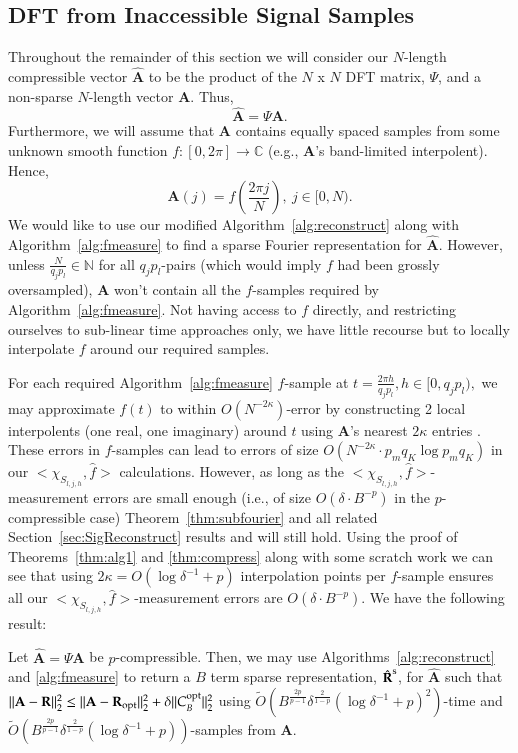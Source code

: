 \documentclass{article}
\begin{document}
\subsection{DFT from Inaccessible Signal Samples}
\label{sec:inaccessible}

Throughout the remainder of this section we will consider our $N$-length compressible vector $\hat{\textbf{A}}$ to be the product of the $N$ x $N$ DFT matrix, \textbf{$\Psi$}, and a non-sparse $N$-length vector \textbf{A}.  Thus,
$$\hat{\textbf{A}} = \Psi \textbf{A}.$$
Furthermore, we will assume that \textbf{A} contains equally spaced samples from some unknown smooth function $f: [0,2 \pi] \rightarrow \mathbb{C}$ (e.g., \textbf{A}'s band-limited interpolent).  Hence,
$$\textbf{A}(j) = f \left( \frac{2 \pi j}{N} \right),~j \in [0,N).$$
We would like to use our modified Algorithm~\ref{alg:reconstruct} along with Algorithm~\ref{alg:fmeasure} to find a sparse Fourier representation for $\hat{\textbf{A}}$.  However, unless $\frac{N}{q_{j}p_{l}} \in \mathbb{N}$ for all $q_{j}p_{l}$-pairs (which would imply $f$ had been grossly oversampled), \textbf{A} won't contain all the $f$-samples required by Algorithm~\ref{alg:fmeasure}.  Not having access to $f$ directly, and restricting ourselves to sub-linear time approaches only, we have little recourse but to locally interpolate $f$ around our required samples.

For each required Algorithm~\ref{alg:fmeasure} $f$-sample at $t = \frac{2 \pi h}{q_{j}p_{l}}, h \in [0,q_{j}p_{l}),$ we may approximate $f(t)$ to within $O(N^{-2 \kappa})$-error by constructing 2 local interpolents (one real, one imaginary) around $t$ using \textbf{A}'s nearest $2 \kappa$ entries \cite{BasicInterp}.  These errors in $f$-samples can lead to errors of size $O( N^{-2 \kappa} \cdot p_{m}q_{K} \log p_{m}q_{K})$ in our $<\chi_{S_{l,j,h}}, \hat{f}>$ calculations.  However, as long as the $<\chi_{S_{l,j,h}}, \hat{f}>$-measurement errors are small enough (i.e., of size $O(\delta \cdot B^{-p})$ in the $p$-compressible case) Theorem~\ref{thm:subfourier} and all related Section~\ref{sec:SigReconstruct} results and will still hold.  Using the proof of Theorems~\ref{thm:alg1} and \ref{thm:compress} along with some scratch work we can see that using $2 \kappa = O(\log \delta^{-1} + p)$ interpolation points per $f$-sample ensures all our $<\chi_{S_{l,j,h}}, \hat{f}>$-measurement errors are $O(\delta \cdot B^{-p})$.  We have the following result:

\begin{Theorem}
Let $\hat{\textbf{A}} = \Psi \textbf{A}$ be $p$-compressible.  Then, we may use Algorithms~\ref{alg:reconstruct} and \ref{alg:fmeasure} to return a $B$ term sparse representation, $\hat{\textbf{R}}^{\rm s}$, for $\hat{\textbf{A}}$ such that $\| \textbf{A} - \textbf{R} \|^{2}_{2} \leq \| \textbf{A} - \textbf{R}_{\rm opt} \|^{2}_{2} + \delta \| C^{\rm opt}_{B} \|^{2}_{2}$ using $\tilde{O} \left( B^{\frac{2p}{p-1}} \delta^{\frac{2}{1-p}} (\log \delta^{-1} + p)^{2} \right)$-time and $\tilde{O} \left( B^{\frac{2p}{p-1}} \delta^{\frac{2}{1-p}} (\log \delta^{-1} + p) \right)$-samples from \textbf{A}.
\label{thm:detDFT}
\end{Theorem}
\end{document}
